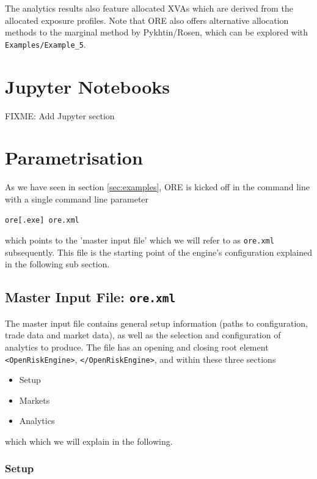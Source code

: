 \documentclass[12pt, a4paper]{article}
\begin{document}
The analytics results also feature allocated XVAs which are derived from the allocated exposure profiles. Note that ORE also offers alternative allocation methods to the marginal method by Pykhtin/Rosen, which can be explored with {\tt Examples/Example\_5}.

\section{Jupyter Notebooks}

FIXME: Add Jupyter section

\section{Parametrisation}\label{sec:configuration}

As we have seen in section \ref{sec:examples}, ORE is kicked off
in the command line with a single command line parameter 

\medskip
\centerline{\tt ore[.exe] ore.xml}
\medskip

which points to the 'master input file' which we will refer to 
as {\tt ore.xml} subsequently. 
This file is the starting point of the engine's configuration explained in the following sub section.

\subsection{Master Input File: {\tt ore.xml}}

The master input file contains general setup information (paths to configuration, trade data and market data), as well as the selection and configuration of  analytics to produce. The file has an opening and closing root element {\tt <OpenRiskEngine>}, {\tt </OpenRiskEngine>}, and within these three sections 
\begin{itemize}
\item Setup
\item Markets
\item Analytics
\end{itemize}
which which we will explain in the following.

\subsubsection*{Setup}
\end{document}
